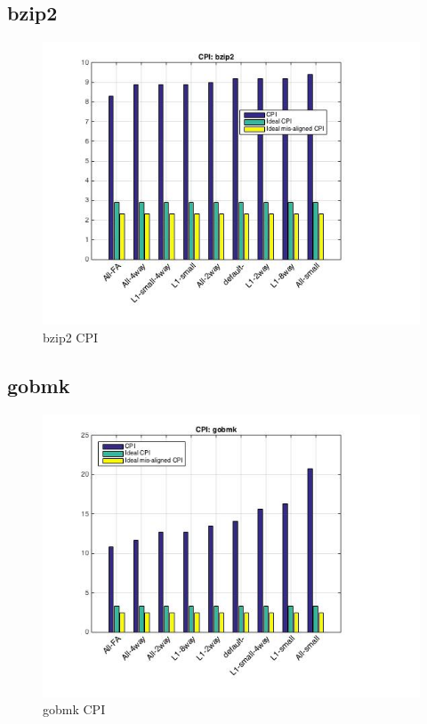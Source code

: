 \documentclass[11pt,titlepage]{article}
\begin{document}
    \subsection{bzip2}
        \begin{figure}[H]
            \centering
            \includegraphics[scale=0.75]{CPIbzip2}
            \caption{bzip2 CPI}
            \label{fig:CPIbzip2}
        \end{figure}

    \subsection{gobmk}
        \begin{figure}[H]
            \centering
            \includegraphics[scale=0.75]{CPIgobmk}
            \caption{gobmk CPI}
            \label{fig:CPIgobmk}
        \end{figure}
\end{document}
